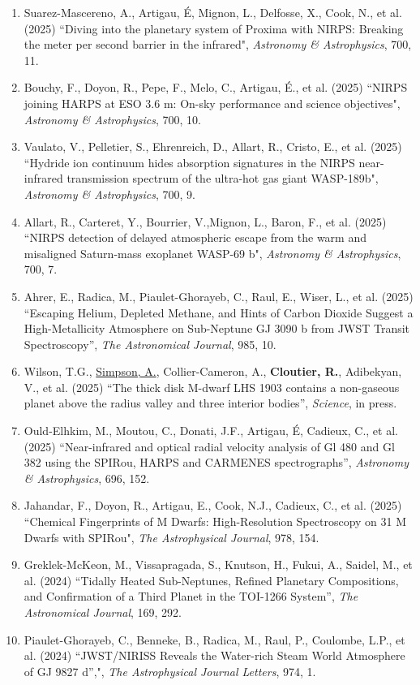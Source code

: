 \documentclass[12pt]{article}
\begin{document}
\begin{itemize}
\begin{enumerate}
\item Suarez-Mascereno, A., Artigau, \'E, Mignon, L., Delfosse, X., Cook, N., et al. (2025) ``Diving into the planetary system of Proxima with NIRPS: Breaking the meter per second barrier in the infrared", {\it Astronomy \& Astrophysics}, 700, 11.
\item Bouchy, F., Doyon, R., Pepe, F., Melo, C., Artigau, \'E., et al. (2025) ``NIRPS joining HARPS at ESO 3.6 m: On-sky performance and science objectives", {\it Astronomy \& Astrophysics}, 700, 10.
\item Vaulato, V., Pelletier, S., Ehrenreich, D., Allart, R., Cristo, E., et al. (2025) ``Hydride ion continuum hides absorption signatures in the NIRPS near-infrared transmission spectrum of the ultra-hot gas giant WASP-189b", {\it Astronomy \& Astrophysics}, 700, 9.
\item Allart, R., Carteret, Y., Bourrier, V.,Mignon, L., Baron, F., et al. (2025) ``NIRPS detection of delayed atmospheric escape from the warm and misaligned Saturn-mass exoplanet WASP-69 b", {\it Astronomy \& Astrophysics}, 700, 7.
\item Ahrer, E., Radica, M., Piaulet-Ghorayeb, C., Raul, E., Wiser, L., et al. (2025) ``Escaping Helium, Depleted Methane, and Hints of Carbon Dioxide Suggest a High-Metallicity Atmosphere on Sub-Neptune GJ 3090 b from JWST Transit Spectroscopy'', {\it The Astronomical Journal}, 985, 10.
\item Wilson, T.G., \underline{Simpson, A.}, Collier-Cameron, A., {\bf Cloutier, R.}, Adibekyan, V., et al. (2025) ``The thick disk M-dwarf LHS 1903 contains a non-gaseous planet above the radius valley and three interior bodies'', {\it Science}, in press.
\item Ould-Elhkim, M., Moutou, C., Donati, J.F., Artigau, \'E, Cadieux, C., et al. (2025) ``Near-infrared and optical radial velocity analysis of Gl 480 and Gl 382 using the SPIRou, HARPS and CARMENES spectrographs'', {\it Astronomy \& Astrophysics}, 696, 152.
\item Jahandar, F., Doyon, R., Artigau, E., Cook, N.J., Cadieux, C., et al. (2025) ``Chemical Fingerprints of M Dwarfs: High-Resolution Spectroscopy on 31 M Dwarfs with SPIRou", {\it The Astrophysical Journal}, 978, 154.
\item Greklek-McKeon, M., Vissapragada, S., Knutson, H., Fukui, A., Saidel, M., et al. (2024) ``Tidally Heated Sub-Neptunes, Refined Planetary Compositions, and Confirmation of a Third Planet in the TOI-1266 System”, {\it The Astronomical Journal}, 169, 292.
\item Piaulet-Ghorayeb, C., Benneke, B., Radica, M., Raul, P., Coulombe, L.P., et al. (2024) ``JWST/NIRISS Reveals the Water-rich Steam World Atmosphere of GJ 9827 d”,", {\it The Astrophysical Journal Letters}, 974, 1.

\end{enumerate}
\end{itemize}
\end{document}
